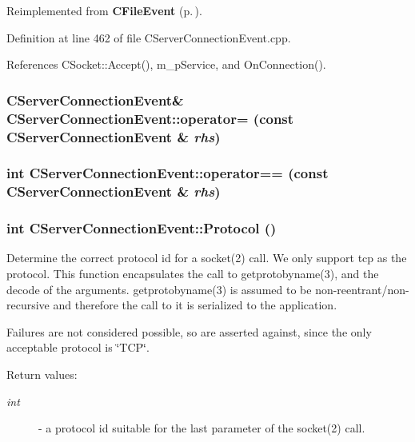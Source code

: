 Reimplemented from {\bf CFile\-Event} {\rm (p.\,\pageref{classCFileEvent_a15})}.

Definition at line 462 of file CServer\-Connection\-Event.cpp.

References CSocket::Accept(), m\_\-p\-Service, and On\-Connection().
\subsubsection{\setlength{\rightskip}{0pt plus 5cm}CServer\-Connection\-Event\& CServer\-Connection\-Event::operator= (const CServer\-Connection\-Event \& {\em rhs})\hspace{0.3cm}{\tt  [private]}}\label{classCServerConnectionEvent_c1}


\subsubsection{\setlength{\rightskip}{0pt plus 5cm}int CServer\-Connection\-Event::operator== (const CServer\-Connection\-Event \& {\em rhs})\hspace{0.3cm}{\tt  [private]}}\label{classCServerConnectionEvent_c2}


\subsubsection{\setlength{\rightskip}{0pt plus 5cm}int CServer\-Connection\-Event::Protocol ()\hspace{0.3cm}{\tt  [protected]}}\label{classCServerConnectionEvent_b4}


Determine the correct protocol id for a socket(2) call. We only support tcp as the protocol. This function encapsulates the call to getprotobyname(3), and the decode of the arguments. getprotobyname(3) is assumed to be non-reentrant/non-recursive and therefore the call to it is serialized to the application.

Failures are not considered possible, so are asserted against, since the only acceptable protocol is \char`\"{}TCP\char`\"{}.\begin{Desc}
\item[Return values: ]\par
\begin{description}
\item[{\em 
int}]- a protocol id suitable for the last parameter of the socket(2) call. \end{description}
\end{Desc}



